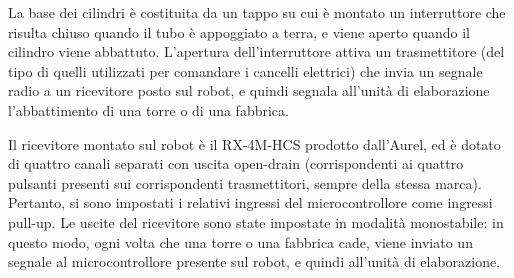 La base dei cilindri è costituita da un tappo su cui è montato un interruttore che risulta chiuso quando il tubo è appoggiato a terra, e viene aperto quando il cilindro viene abbattuto. L'apertura dell'interruttore attiva un trasmettitore (del tipo di quelli utilizzati per comandare i cancelli elettrici) che invia un segnale radio a un ricevitore posto sul robot, e quindi segnala all'unità di elaborazione l'abbattimento di una torre o di una fabbrica.

Il ricevitore montato sul robot è il RX-4M-HCS prodotto dall'Aurel, ed è dotato di quattro canali separati con uscita open-drain (corrispondenti ai quattro pulsanti presenti sui corrispondenti trasmettitori, sempre della stessa marca). Pertanto, si sono impostati i relativi ingressi del microcontrollore come ingressi pull-up. Le uscite del ricevitore sono state impostate in modalità monostabile: in questo modo, ogni volta che una torre o una fabbrica cade, viene inviato un segnale al microcontrollore presente sul robot, e quindi all'unità di elaborazione.
